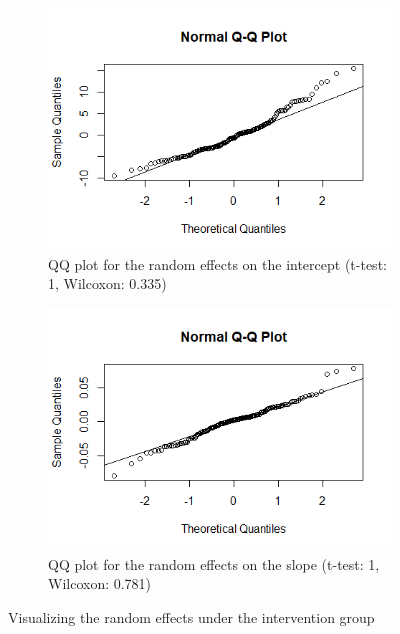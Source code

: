 \begin{figure}[H]
\centering
\begin{subfigure}{.4\textwidth}
  \centering
  \includegraphics[width=1\linewidth]{../../plots/qq_intercept_treatment.png}
  \caption{QQ plot for the random effects on the intercept (t-test: 1, Wilcoxon: 0.335)}
\end{subfigure}
\begin{subfigure}{.4\textwidth}
  \centering
  \includegraphics[width=1\linewidth]{../../plots/qq_slope_treatment.png}
  \caption{QQ plot for the random effects on the slope (t-test: 1, Wilcoxon: 0.781)}
\end{subfigure}
\caption{Visualizing the random effects under the intervention group}
\label{fig:re.treatment}
\end{figure}

